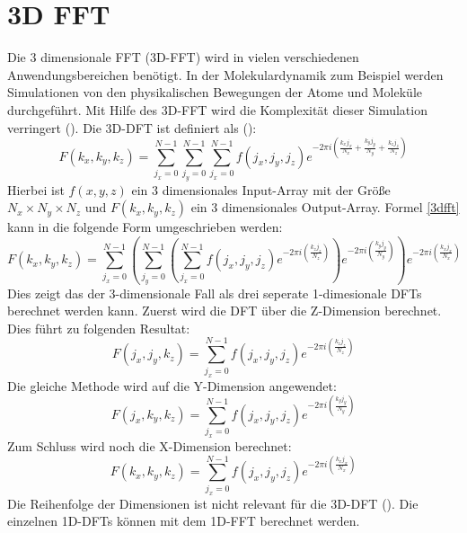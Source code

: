 \section{3D FFT}
Die 3 dimensionale FFT (3D-FFT) wird in vielen verschiedenen Anwendungsbereichen benötigt.
In der Molekulardynamik zum Beispiel werden Simulationen von den physikalischen Bewegungen der Atome und Moleküle durchgeführt. Mit Hilfe des 3D-FFT wird die Komplexität dieser Simulation verringert (\cite[S.1]{shahe 14}).
\newline
Die 3D-DFT ist definiert als (\cite[S.4]{sig 07}):
\begin{equation}
F(k_x,k_y, k_z)= \sum_{j_x=0}^{N-1} \sum_{j_y=0}^{N-1} \sum_{j_x=0}^{N-1} 
f(j_x,j_y, j_z) e^{-2 \pi i \left( \frac{k_x j_x}{N_x} + \frac{k_y j_y}{N_y} + \frac{k_z j_z}{N_z} \right)}
\label{3dfft}
\end{equation}
Hierbei ist $f(x, y, z)$ ein 3 dimensionales Input-Array mit der Größe $N_x \times N_y \times N_z$ und $F(k_x,k_y, k_z)$ ein 3 dimensionales Output-Array.
Formel \ref{3dfft} kann in die folgende Form umgeschrieben werden:
\begin{equation}
F(k_x,k_y, k_z)= \sum_{j_x=0}^{N-1} \left( \sum_{j_y=0}^{N-1} \left( \sum_{j_x=0}^{N-1} 
f(j_x,j_y, j_z) e^{-2 \pi i \left( \frac{k_z j_z}{N_z} \right)} \right) e^{-2 \pi i \left( \frac{k_y j_y}{N_y} \right)} \right) e^{-2 \pi i \left( \frac{k_x j_x}{N_x} \right)}
\end{equation}
Dies zeigt das der 3-dimensionale Fall als drei seperate 1-dimesionale DFTs berechnet werden kann. Zuerst wird die DFT über die Z-Dimension berechnet. Dies führt zu folgenden Resultat:
\begin{equation}
F(j_x,j_y, k_z)=\sum_{j_x=0}^{N-1} 
f(j_x,j_y, j_z) e^{-2 \pi i \left( \frac{k_z j_z}{N_z} \right)}
\label{eq3dz}
\end{equation}
Die gleiche Methode wird auf die Y-Dimension angewendet:
\begin{equation}
F(j_x,k_y, k_z)=\sum_{j_x=0}^{N-1} 
f(j_x,j_y, j_z) e^{-2 \pi i \left( \frac{k_y j_y}{N_y} \right)}
\label{eq3dy}
\end{equation}
Zum Schluss wird noch die X-Dimension berechnet:
\begin{equation}
F(k_x,k_y, k_z)=\sum_{j_x=0}^{N-1} 
f(j_x,j_y, j_z) e^{-2 \pi i \left( \frac{k_x j_x}{N_x} \right)}
\label{eq3dx}
\end{equation}
Die Reihenfolge der Dimensionen ist nicht relevant für die 3D-DFT (\cite[S.3-4]{sig 07}).
Die einzelnen 1D-DFTs können mit dem 1D-FFT berechnet werden.

